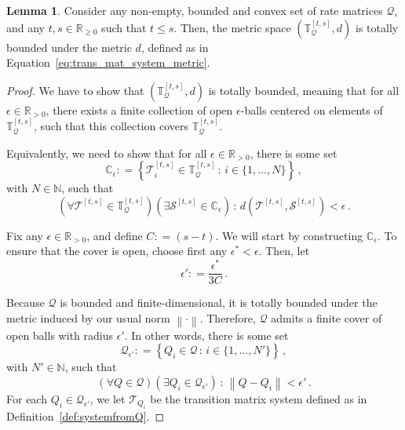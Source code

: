 \documentclass[10pt]{paper}
\theoremstyle{definition}
\newtheorem{lemma}[theorem]{Lemma}
\newcommand{\nats}{\mathbb{N}}
\newcommand{\reals}{\mathbb{R}}
\newcommand{\realspos}{\reals_{>0}}
\newcommand{\realsnonneg}{\reals_{\geq 0}}
\newcommand{\rateset}{\mathcal{Q}}
\newcommand{\norm}[1]{\left\lVert #1 \right\rVert}
\newcommand{\coloneqq}{:\!=}
\begin{document}
\begin{lemma}\label{lemma:restricted_trans_mat_system_totally_bounded_if_Q_bounded_convex}
Consider any non-empty, bounded and convex set of rate matrices $\rateset$, and any $t,s\in\realsnonneg$ such that $t\leq s$. Then, the metric space $(\mathbb{T}_\rateset^{[t,s]},d)$ is totally bounded under the metric $d$, defined as in Equation~\eqref{eq:trans_mat_system_metric}.
\end{lemma}
\begin{proof}
We have to show that $(\mathbb{T}_\rateset^{[t,s]},d)$ is totally bounded, meaning that for all $\epsilon\in\realspos$, there exists a finite collection of open $\epsilon$-balls centered on elements of $\mathbb{T}_\rateset^{[t,s]}$, such that this collection covers $\mathbb{T}_\rateset^{[t,s]}$. 

Equivalently, we need to show that for all $\epsilon\in\realspos$, there is some set
\begin{equation*}
\mathbb{C}_\epsilon\coloneqq \left\{\mathcal{T}_i^{[t,s]}\in\mathbb{T}_\rateset^{[t,s]}\,:\,i\in\{1,\ldots,N\}\right\}\,,
\end{equation*}
with $N\in\nats$, such that
\begin{equation*}
(\forall \mathcal{T}^{[t,s]}\in\mathbb{T}_\rateset^{[t,s]})(\exists \mathcal{S}^{[t,s]}\in \mathbb{C}_\epsilon)\,:\,d(\mathcal{T}^{[t,s]},\mathcal{S}^{[t,s]}) < \epsilon\,.
\end{equation*}

Fix any $\epsilon\in\realspos$, and define $C\coloneqq (s-t)$. We will start by constructing $\mathbb{C}_\epsilon$. To ensure that the cover is open, choose first any $\epsilon^*<\epsilon$. Then, let
\begin{equation*}
\epsilon' \coloneqq \frac{\epsilon^*}{3C}\,.
\end{equation*}

Because $\rateset$ is bounded and finite-dimensional, it is totally bounded under the metric induced by our usual norm $\norm{\cdot}$. Therefore, $\rateset$ admits a finite cover of open balls with radius $\epsilon'$. In other words, there is some set
\begin{equation*}
\rateset_{\epsilon'}\coloneqq \left\{Q_i\in\rateset\,:\,i\in\{1,\ldots,N'\}\right\}\,,
\end{equation*}
with $N'\in\nats$, such that
\begin{equation*}
(\forall Q\in\rateset)(\exists Q_i\in\rateset_{\epsilon'})\,:\,\norm{Q - Q_i} < \epsilon'\,.
\end{equation*}
For each $Q_i\in\rateset_{\epsilon'}$, we let $\mathcal{T}_{Q_i}$ be the transition matrix system defined as in Definition~\ref{def:systemfromQ}.


\end{proof}
\end{document}
